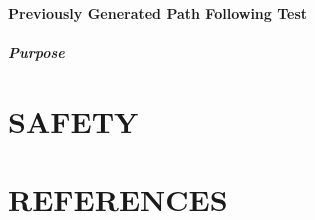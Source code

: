 \documentclass[12pt]{article}
\begin{document}

\paragraph*{Previously Generated Path Following Test} 

\subparagraph*{Purpose} 


\section{SAFETY}

\section{REFERENCES}

\singlespacing
 

\end{document}
